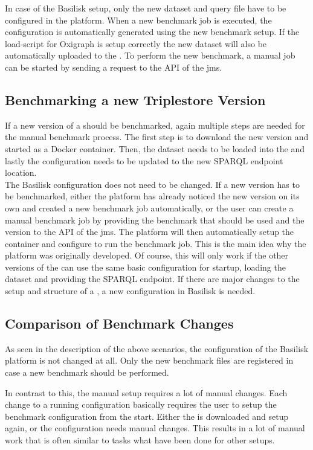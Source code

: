 In case of the Basilisk setup, only the new dataset and query file have to be configured in the platform.
When a new benchmark job is executed, the \iguana{} configuration is automatically generated using the new benchmark setup.
If the load-script for Oxigraph is setup correctly the new dataset will also be automatically uploaded to the \ts{}.
To perform the new benchmark, a manual job can be started by sending a request to the API of the \ac{jms}.


\subsection{Benchmarking a new Triplestore Version}
If a new version of a \ts{} should be benchmarked, again multiple steps are needed for the manual benchmark process.
The first step is to download the new version and started as a Docker container.
Then, the dataset needs to be loaded into the \ts{} and lastly the \iguana{} configuration needs to be updated to the new SPARQL endpoint location.
\\

The Basilisk configuration does not need to be changed.
If a new version has to be benchmarked, either the platform has already noticed the new version on its own and created a new benchmark job automatically, or the user can create a manual benchmark job by providing the benchmark that should be used and the \ts{} version to the API of the \ac{jms}.
The platform will then automatically setup the container and configure \iguana{} to run the benchmark job.
This is the main idea why the platform was originally developed.
Of course, this will only work if the other versions of the \ts{} can use the same basic configuration for startup, loading the dataset and providing the SPARQL endpoint.
If there are major changes to the setup and structure of a \ts{}, a new configuration in Basilisk is needed.


\subsection{Comparison of Benchmark Changes}
As seen in the description of the above scenarios, the \ts{} configuration of the Basilisk platform is not changed at all.
Only the new benchmark files are registered in case a new benchmark should be performed.

In contrast to this, the manual setup requires a lot of manual changes.
Each change to a running configuration basically requires the user to setup the benchmark configuration from the start.
Either the \ts{} is downloaded and setup again, or the \iguana{} configuration needs manual changes.
This results in a lot of manual work that is often similar to tasks what have been done for other setups.


